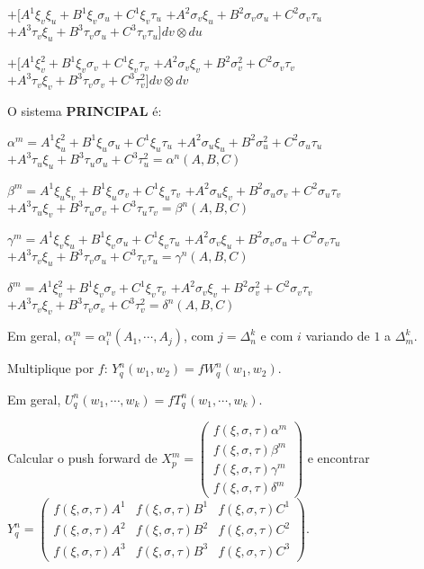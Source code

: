 \documentclass[10pt,a4paper]{article}
\begin{document}
		$+ [A^1 \xi_v \xi_u  + B^1 \xi_v \sigma_u  + C^1 \xi_v \tau_u$
		$+ A^2 \sigma_v \xi_u  + B^2 \sigma_v \sigma_u  + C^2 \sigma_v \tau_u$
		$+ A^3 \tau_v \xi_u  + B^3 \tau_v \sigma_u  + C^3 \tau_v \tau_u] dv \otimes du$

		$+ [A^1 \xi_v^2  + B^1 \xi_v \sigma_v  + C^1 \xi_v \tau_v $
		$+ A^2 \sigma_v \xi_v  + B^2 \sigma_v^2  + C^2 \sigma_v \tau_v$
		$+ A^3 \tau_v \xi_v  + B^3 \tau_v \sigma_v  + C^3 \tau_v^2] dv \otimes dv$

		\vspace{3mm}

		O sistema \textbf{PRINCIPAL} \'e:

		$\alpha^m = A^1 \xi_u^2  + B^1 \xi_u \sigma_u  + C^1 \xi_u \tau_u$
		$+ A^2 \sigma_u \xi_u  + B^2 \sigma_u^2  + C^2 \sigma_u \tau_u$
		$+ A^3 \tau_u \xi_u  + B^3 \tau_u \sigma_u  + C^3 \tau_u^2 = \alpha^n(A,B,C)$

		$\beta^m = A^1 \xi_u \xi_v  + B^1 \xi_u \sigma_v  + C^1 \xi_u \tau_v$
		$+ A^2 \sigma_u \xi_v  + B^2 \sigma_u \sigma_v  + C^2 \sigma_u \tau_v$
		$+ A^3 \tau_u \xi_v  + B^3 \tau_u \sigma_v  + C^3 \tau_u \tau_v = \beta^n(A,B,C)$

		$\gamma^m = A^1 \xi_v \xi_u  + B^1 \xi_v \sigma_u  + C^1 \xi_v \tau_u$
		$+ A^2 \sigma_v \xi_u  + B^2 \sigma_v \sigma_u  + C^2 \sigma_v \tau_u$
		$+ A^3 \tau_v \xi_u  + B^3 \tau_v \sigma_u  + C^3 \tau_v \tau_u = \gamma^n(A,B,C)$

		$\delta^m = A^1 \xi_v^2  + B^1 \xi_v \sigma_v  + C^1 \xi_v \tau_v $
		$+ A^2 \sigma_v \xi_v  + B^2 \sigma_v^2  + C^2 \sigma_v \tau_v$
		$+ A^3 \tau_v \xi_v  + B^3 \tau_v \sigma_v  + C^3 \tau_v^2 = \delta^n(A,B,C)$

		\vspace{3mm}

		Em geral, $\alpha_i^m = \alpha_i^n(A_1, \cdots, A_j)$, com $j = \Delta_n^k$ e com $i$ variando de $1$ a $\Delta_m^k$.

		\vspace{3mm}

		Multiplique por $f$: $Y_q^n(w_1, w_2) = f W_q^n(w_1, w_2)$.

		Em geral, $U_q^n(w_1, \cdots, w_k) = f T_q^n(w_1, \cdots, w_k)$.

		\vspace{3mm}

		Calcular o push forward de $X_p^m = \left( \begin{matrix} f(\xi, \sigma, \tau) \alpha^m \\ f(\xi, \sigma, \tau) \beta^m \\ f(\xi, \sigma, \tau) \gamma^m \\ f(\xi, \sigma, \tau) \delta^m \end{matrix} \right)$ e encontrar $Y_q^n = \left( \begin{matrix} f(\xi, \sigma, \tau) A^1 & f(\xi, \sigma, \tau) B^1 & f(\xi, \sigma, \tau) C^1 \\ f(\xi, \sigma, \tau) A^2 & f(\xi, \sigma, \tau) B^2 & f(\xi, \sigma, \tau) C^2 \\ f(\xi, \sigma, \tau) A^3 & f(\xi, \sigma, \tau) B^3 & f(\xi, \sigma, \tau) C^3 \end{matrix} \right)$.
\end{document}
